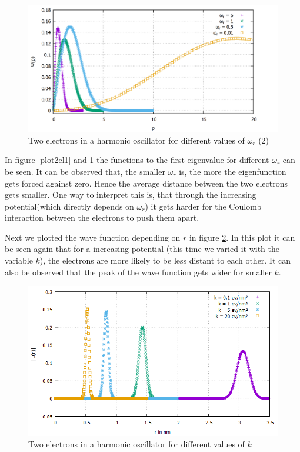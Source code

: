 \documentclass[10pt,a4paper]{article}
\begin{document}
\begin{figure}[h]
	\includegraphics[scale = 0.25]{2Electrons_comparison2_thick.png}
	\centering
	\caption{Two electrons in a harmonic oscillator for different values of $\omega_{r}$ (2) }
	\label{plot2el2}
\end{figure}


In figure \ref{plot2el1} and \ref{plot2el2} the functions to the first eigenvalue for different $\omega_{r}$ can be seen. It can be observed that, the smaller $\omega_{r}$ is, the more the eigenfunction gets forced against zero. Hence the average distance between the two electrons gets smaller. One way to interpret this is, that through the increasing potential(which directly depends on $\omega_{r}$) it gets harder for the Coulomb interaction between the electrons to push them apart.

Next we plotted the wave function depending on $r$ in figure \ref{plot2elr}. In this plot it can be seen again that for a increasing potential (this time we varied it with the variable $k$), the electrons are more likely to be less distant to each other. It can also be observed that the peak of the wave function gets wider for smaller $k$.

\begin{figure}[h]
	\includegraphics[scale = 0.5]{comparison_different_k_thick_verbessert.png}
	\centering
	\caption{Two electrons in a harmonic oscillator for different values of $k$}
	\label{plot2elr}
\end{figure}
\end{document}
